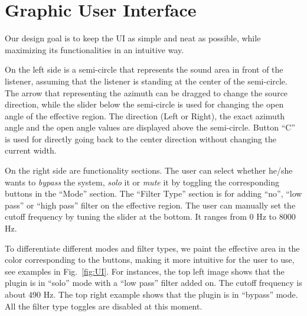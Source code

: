 \documentclass{sig-alternate}
\begin{document}
\section{Graphic User Interface}\label{sec:GUI}

Our design goal is to keep the UI as simple and neat as possible, while maximizing its functionalities in an intuitive way. 

On the left side is a semi-circle that represents the sound area in front of the listener, assuming that the listener is standing at the center of the semi-circle. The arrow that representing the azimuth can be dragged to change the source direction, while the slider below the semi-circle is used for changing the open angle of the effective region. The direction (Left or Right), the exact azimuth angle and the open angle values are displayed above the semi-circle. Button “C” is used for directly going back to the center direction without changing the current width.

On the right side are functionality sections. The user can select whether he/she wants to \textsl{bypass} the system, \textsl{solo} it or \textsl{mute} it by toggling the corresponding buttons in the “Mode” section. The “Filter Type” section is for adding “no”, “low pass” or “high pass” filter on the effective region. The user can manually set the cutoff frequency by tuning the slider at the bottom. It ranges from 0 Hz to 8000 Hz. 

To differentiate different modes and filter types, we paint the effective area in the color corresponding to the buttons, making it more intuitive for the user to use, see examples in Fig.~\ref{fig:UI}. For instances, the top left image shows that the plugin is in “solo” mode with a “low pass” filter added on. The cutoff frequency is about $490$ {Hz}. The top right example shows that the plugin is in “bypass” mode. All the filter type toggles are disabled at this moment.
\end{document}
